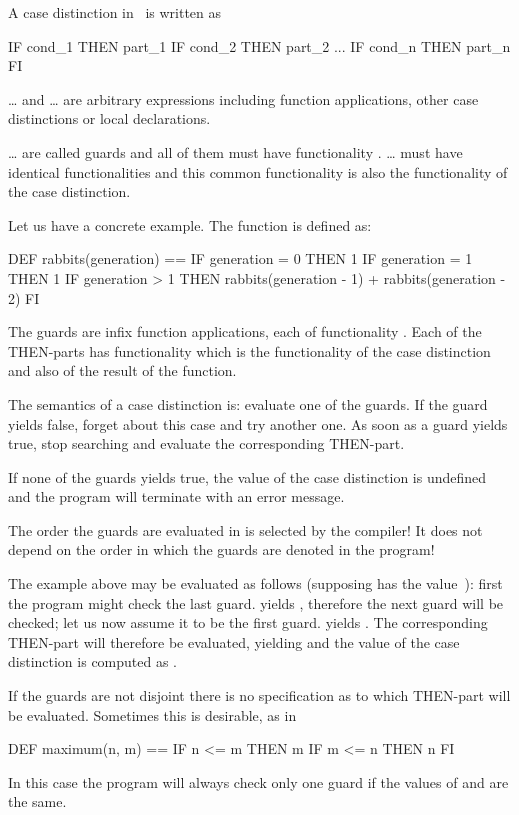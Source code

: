 A case distinction in \opal\ is written as  
\begin{prog}
        IF cond_1 THEN part_1
        IF cond_2 THEN part_2
        ...
        IF cond_n THEN part_n
        FI
\end{prog}
 \dots {} and  \dots {}
are arbitrary expressions including function applications, other case
distinctions or local declarations.

 \dots {} are called guards and all of them must
have functionality .
 \dots {} must have identical functionalities
and this common functionality is also the functionality of the case
distinction. 

Let us have a concrete example. The function  is defined
as:
\begin{prog}
          DEF rabbits(generation) ==
              IF generation = 0 THEN 1
              IF generation = 1 THEN 1
              IF generation > 1 THEN rabbits(generation - 1) 
                                     + rabbits(generation - 2)
              FI  
\end{prog}
The guards are infix function applications, each of functionality
.
Each of the THEN-parts has functionality  which is the
functionality of the case distinction and also of the result of the
function.

The semantics of a case distinction is:      
evaluate one of the guards. 
If the guard yields false, forget about this case and try
another one.
As soon as a guard yields true, stop searching and evaluate the
corresponding THEN-part.

If none of the guards yields true, the value of the case distinction is
undefined and the program will terminate with an error message.

\important  The order the guards are evaluated in is selected by the
compiler! It does not depend on the order in which the guards are
denoted in the program!

\novice The example above may be evaluated as follows (supposing
 has the value~):
first the program might check the last guard.  yields
, therefore the next guard will be checked;  let us now
assume it to be the  first guard.
 yields .  The corresponding THEN-part
will therefore be evaluated, yielding  and the value of the case
distinction is computed as .

\medskip
If the guards are not disjoint there is no specification as to  which THEN-part
will be evaluated.
Sometimes this is desirable, as in
\begin{prog}
        DEF maximum(n, m) == 
                 IF n <= m THEN m
                 IF m <= n THEN n FI
\end{prog}
In this case the program will always check only one guard if the
values of  and  are the same.

